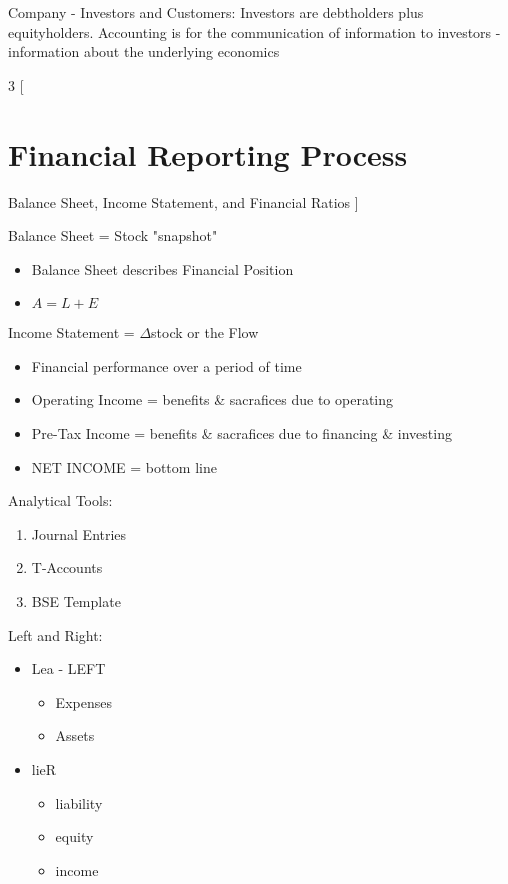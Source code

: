 \documentclass[8pt]{report}
\begin{document}
Company - Investors and Customers: Investors are debtholders plus equityholders. Accounting is for the communication of information to investors - information about the underlying economics 

\begin{multicols}{3}
[
\section{Financial Reporting Process}
Balance Sheet, Income Statement, and Financial Ratios
]

Balance Sheet = Stock "snapshot"
\begin{itemize}
	\item Balance Sheet describes Financial Position
	\item $A = L+E$
\end{itemize}
Income Statement = $\Delta$stock or the Flow
\begin{itemize}
	\item Financial performance over a period of time
	\item Operating Income = benefits \& sacrafices due to operating
	\item Pre-Tax Income = benefits \& sacrafices due to financing \& investing
	\item NET INCOME = bottom line
\end{itemize}

Analytical Tools:
\begin{enumerate}
\item Journal Entries
\item T-Accounts
\item BSE Template
\end{enumerate}

Left and Right:
\begin{itemize}
	\item Lea - LEFT
	\begin{itemize}
		\item Expenses
		\item Assets
	\end{itemize}
	\item lieR
	\begin{itemize}
		\item liability
		\item equity
		\item income
	\end{itemize}
\end{itemize}
\end{multicols}
\end{document}
